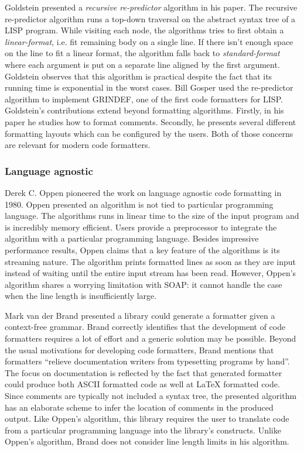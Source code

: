 Goldstein presented a \emph{recursive re-predictor} algorithm in his paper.
The recursive re-predictor algorithm runs a top-down traversal on the abstract syntax tree of a LISP program.
While visiting each node, the algorithms tries to first obtain a \emph{linear-format}, i.e. fit remaining body on a single line.
If there isn't enough space on the line to fit a linear format, the algorithm falls back to \emph{standard-format} where each argument is put on a separate line aligned by the first argument.
Goldstein observes that this algorithm is practical despite the fact that its running time is exponential in the worst cases.
Bill Gosper used the re-predictor algorithm to implement GRINDEF\autocite{_bill_????}, one of the first code formatters for LISP.
Goldstein's contributions extend beyond formatting algorithms.
Firstly, in his paper he studies how to format comments.
Secondly, he presents several different formatting layouts which can be configured by the users.
Both of those concerns are relevant for modern code formatters.

\subsubsection{Language agnostic}\label{sec:agnostic}
Derek C. Oppen pioneered the work on language agnostic code formatting in 1980\autocite{oppen_prettyprinting_1980}.
Oppen presented an algorithm is not tied to particular programming language.
The algorithms runs in linear time to the size of the input program and is incredibly memory efficient.
Users provide a preprocessor to integrate the algorithm with a particular programming language.
Besides impressive performance results, Oppen claims that a key feature of the algorithms is its streaming nature.
The algorithm prints formatted lines as soon as they are input instead of waiting until the entire input stream has been read.
However, Oppen's algorithm shares a worrying limitation with SOAP: it cannot handle the case when the line length is insufficiently large.

Mark van der Brand presented a library could generate a formatter given a context-free grammar\autocite{van_den_brand_generation_1996}.
Brand correctly identifies that the development of code formatters requires a lot of effort and a generic solution may be possible.
Beyond the usual motivations for developing code formatters, Brand mentions that formatters ``relieve documentation writers from typesetting programs by hand''.
The focus on documentation is reflected by the fact that generated formatter could produce both ASCII formatted code as well at \LaTeX{} formatted code.
Since comments are typically not included a syntax tree, the presented algorithm has an elaborate scheme to infer the location of comments in the produced output.
Like Oppen's algorithm, this library requires the user to translate code from a particular programming language into the library's constructs.
Unlike Oppen's algorithm, Brand does not consider line length limits in his algorithm.

